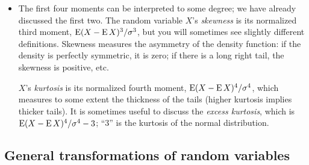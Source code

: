 \begin{itemize}
\item The first four moments can be interpreted to some degree; we
  have already discussed the first two.  The random variable $X$'s
  \emph{skewness} is its normalized third moment, $\operatorname{E}(X - \operatorname{E} X)^3 /
  \sigma^3$, but you will sometimes see slightly different definitions.
  Skewness measures the asymmetry of the density function: if the
  density is perfectly symmetric, it is zero; if there is a long right
  tail, the skewness is positive, etc.

  $X$'s \emph{kurtosis} is its normalized fourth moment, $\operatorname{E}(X - \operatorname{E}
  X)^4 / \sigma^4$, which measures to some extent the thickness of the tails
  (higher kurtosis implies thicker tails).  It is sometimes useful to
  discuss the \emph{excess kurtosis}, which is $\operatorname{E}(X - \operatorname{E} X)^4 / \sigma^4 -
  3$; ``$3$'' is the kurtosis of the normal distribution.

\end{itemize}

\subsection{General transformations of random variables}

